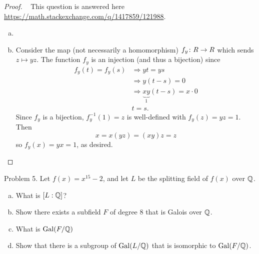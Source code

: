 \documentclass{article}
\begin{document}
\begin{proof} ~
  This question is answered here \url{https://math.stackexchange.com/q/1417859/121988}.
  \begin{enumerate}[(a)]
    \item
    \item Consider the map (not necessarily a homomorphism) ${f_y \colon R \rightarrow R}$ which
    sends $z \mapsto yz$. The function $f_y$ is an injection
    (and thus a bijection) since \begin{align*}
      f_y(t) = f_y(s)
      &\Longrightarrow yt = ys  \\
      &\Longrightarrow y(t-s) = 0 \\
      &\Longrightarrow \underbrace{xy}_1(t-s) = x \cdot 0 \\
      & t = s.
    \end{align*}
    Since $f_y$ is a bijection, $f_y^{-1}(1) = z$ is well-defined with
    $f_y(z) = yz = 1$. Then \[
      x = x(yz) = (xy)z = z
    \] so $f_y(x) = yx = 1$, as desired.
  \end{enumerate}
\end{proof}
\pagebreak

\begin{subsection}{Problem 5.}
  Let $f(x) = x^{15} - 2$, and let $L$ be the splitting field of $f(x)$ over $\mathbb Q$.
  \begin{enumerate}[(a)]
    \item What is $[L:\mathbb Q]$?
    \item Show there exists a subfield $F$ of degree $8$ that is Galois over $\mathbb Q$.
    \item What is $\operatorname{Gal}(F/\mathbb Q)$
    \item Show that there is a subgroup of $\operatorname{Gal}(L/\mathbb Q)$ that is isomorphic to $\operatorname{Gal}(F/\mathbb Q)$.
  \end{enumerate}
\end{subsection}
\end{document}
